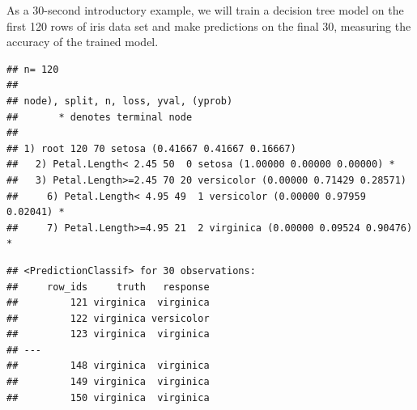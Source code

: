 \documentclass[
]{scrbook}
\newenvironment{Shaded}{\begin{snugshade}}{\end{snugshade}}
\newcommand{\AttributeTok}[1]{\textcolor[rgb]{0.77,0.63,0.00}{#1}}
\newcommand{\CommentTok}[1]{\textcolor[rgb]{0.56,0.35,0.01}{\textit{#1}}}
\newcommand{\DecValTok}[1]{\textcolor[rgb]{0.00,0.00,0.81}{#1}}
\newcommand{\FunctionTok}[1]{\textcolor[rgb]{0.00,0.00,0.00}{#1}}
\newcommand{\NormalTok}[1]{#1}
\newcommand{\OtherTok}[1]{\textcolor[rgb]{0.56,0.35,0.01}{#1}}
\newcommand{\SpecialCharTok}[1]{\textcolor[rgb]{0.00,0.00,0.00}{#1}}
\newcommand{\StringTok}[1]{\textcolor[rgb]{0.31,0.60,0.02}{#1}}
\renewenvironment{Shaded} {\begin{snugshade}\small} {\end{snugshade}}
\begin{document}
As a 30-second introductory example, we will train a decision tree model on the first 120 rows of iris data set and make predictions on the final 30, measuring the accuracy of the trained model.

\begin{Shaded}
\end{Shaded}

\begin{verbatim}
## n= 120 
## 
## node), split, n, loss, yval, (yprob)
##       * denotes terminal node
## 
## 1) root 120 70 setosa (0.41667 0.41667 0.16667)  
##   2) Petal.Length< 2.45 50  0 setosa (1.00000 0.00000 0.00000) *
##   3) Petal.Length>=2.45 70 20 versicolor (0.00000 0.71429 0.28571)  
##     6) Petal.Length< 4.95 49  1 versicolor (0.00000 0.97959 0.02041) *
##     7) Petal.Length>=4.95 21  2 virginica (0.00000 0.09524 0.90476) *
\end{verbatim}

\begin{Shaded}
\end{Shaded}

\begin{verbatim}
## <PredictionClassif> for 30 observations:
##     row_ids     truth   response
##         121 virginica  virginica
##         122 virginica versicolor
##         123 virginica  virginica
## ---                             
##         148 virginica  virginica
##         149 virginica  virginica
##         150 virginica  virginica
\end{verbatim}
\end{document}
